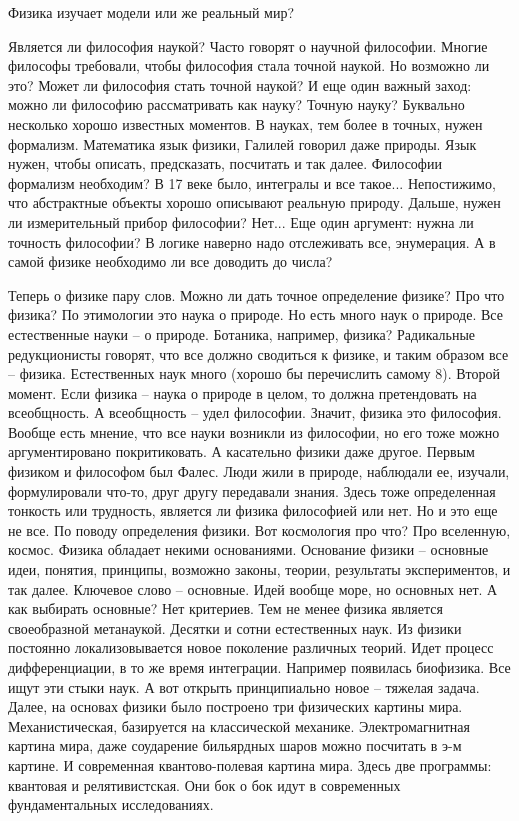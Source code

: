 \documentclass[a4paper, 12pt]{article}
\begin{document}
Физика изучает модели или же реальный мир?

Является ли философия наукой? Часто говорят о научной философии. Многие 
философы требовали, чтобы философия стала точной наукой. Но возможно ли 
это? Может ли философия стать точной наукой?
%
И еще один важный заход: можно ли философию рассматривать как науку? 
Точную науку? Буквально несколько хорошо известных моментов. В науках, 
тем более в точных, нужен формализм. Математика язык физики, Галилей 
говорил даже природы. Язык нужен, чтобы описать, предсказать, посчитать 
и так далее. Философии формализм необходим? В 17 веке было, интегралы 
и все такое... Непостижимо, что абстрактные объекты хорошо описывают 
реальную природу.
%
Дальше, нужен ли измерительный прибор философии? Нет...
%
Еще один аргумент: нужна ли точность философии? В логике наверно надо 
отслеживать все, энумерация. А в самой физике необходимо ли все доводить 
до числа?

Теперь о физике пару слов. Можно ли дать точное определение физике? Про 
что физика? По этимологии это наука о природе. Но есть много наук 
о природе. Все естественные науки -- о природе. Ботаника, например, 
физика? Радикальные редукционисты говорят, что все должно сводиться 
к физике, и таким образом все -- физика. Естественных наук много (хорошо 
бы перечислить самому 8).
%
Второй момент. Если физика -- наука о природе в целом, то должна 
претендовать на всеобщность. А всеобщность -- удел философии. Значит, 
физика это философия. Вообще есть мнение, что все науки возникли из 
философии, но его тоже можно аргументировано покритиковать. А касательно 
физики даже другое. Первым физиком и философом был Фалес. Люди жили 
в природе, наблюдали ее, изучали, формулировали что-то, друг другу 
передавали знания. Здесь тоже определенная тонкость или трудность, 
является ли физика философией или нет. Но и это еще не все.
%
По поводу определения физики. Вот космология про что? Про вселенную, 
космос. Физика обладает некими основаниями. Основание физики -- основные 
идеи, понятия, принципы, возможно законы, теории, результаты 
экспериментов, и так далее. Ключевое слово -- основные. Идей вообще 
море, но основных нет. А как выбирать основные? Нет критериев. Тем не 
менее физика является своеобразной метанаукой. Десятки и сотни 
естественных наук. Из физики постоянно локализовывается новое поколение 
различных теорий. Идет процесс дифференциации, в то же время интеграции. 
Например появилась биофизика. Все ищут эти стыки наук. А вот открыть 
принципиально новое -- тяжелая задача.
%
Далее, на основах физики было построено три физических картины мира. 
Механистическая, базируется на классической механике. Электромагнитная 
картина мира, даже соударение бильярдных шаров можно посчитать в э-м 
картине. И современная квантово-полевая картина мира. Здесь две 
программы: квантовая и релятивистская. Они бок о бок идут в современных 
фундаментальных исследованиях.
\end{document}
